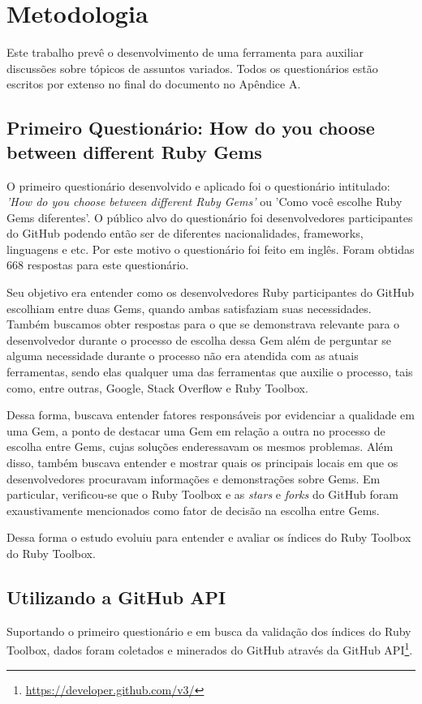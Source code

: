 \chapter{Metodologia}

Este trabalho prevê o desenvolvimento de uma ferramenta para auxiliar discussões sobre tópicos de assuntos variados. Todos os questionários estão escritos por extenso no final do documento no Apêndice A.

\section{Primeiro Questionário: How do you choose between different Ruby Gems}

O primeiro questionário desenvolvido e aplicado foi o questionário intitulado: \textit{'How do you choose between different Ruby Gems'} ou 'Como você escolhe Ruby Gems diferentes'. O público alvo do questionário foi desenvolvedores participantes do GitHub podendo então ser de diferentes nacionalidades, frameworks, linguagens e etc. Por este motivo o questionário foi feito em inglês. Foram obtidas 668 respostas para este questionário.

Seu objetivo era entender como os desenvolvedores Ruby participantes do GitHub escolhiam entre duas Gems, quando ambas satisfaziam suas necessidades. Também buscamos obter respostas para o que se demonstrava relevante para o desenvolvedor durante o processo de escolha dessa Gem além de perguntar se alguma necessidade durante o processo não era atendida com as atuais ferramentas, sendo elas qualquer uma das ferramentas que auxilie o processo, tais como, entre outras, Google, Stack Overflow e Ruby Toolbox.

Dessa forma, buscava entender fatores responsáveis por evidenciar a qualidade em uma Gem, a ponto de destacar uma Gem em relação a outra no processo de escolha entre Gems, cujas soluções enderessavam os mesmos problemas. Além disso, também buscava entender e mostrar quais os principais locais em que os desenvolvedores procuravam informações e demonstrações sobre Gems. Em particular, verificou-se que o Ruby Toolbox e as \textit{stars} e \textit{forks} do GitHub foram exaustivamente mencionados como fator de decisão na escolha entre Gems.

Dessa forma o estudo evoluiu para entender e avaliar os índices do Ruby Toolbox do Ruby Toolbox.

\section{Utilizando a GitHub API}
Suportando o primeiro questionário e em busca da validação dos índices do Ruby Toolbox, dados foram coletados e minerados do GitHub através da GitHub API\footnote{\url{https://developer.github.com/v3/}}. 

